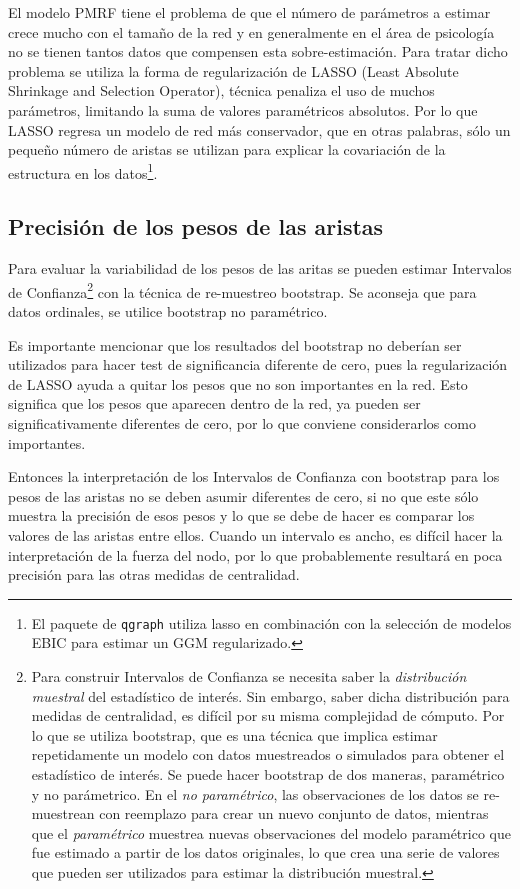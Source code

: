 \documentclass[11pt,spanish]{article}\usepackage[]{graphicx}\usepackage[]{color}
\begin{document}
El modelo PMRF tiene el problema de que el número de parámetros a estimar crece mucho con el tamaño de la red y en generalmente en el área de psicología no se tienen tantos datos que compensen esta sobre-estimación. Para tratar dicho problema se utiliza la forma de regularización de LASSO (Least Absolute Shrinkage and Selection Operator), técnica penaliza el uso de muchos parámetros, limitando la suma de valores paramétricos absolutos. Por lo que LASSO regresa un modelo de red más conservador, que en otras palabras, sólo un pequeño número de aristas se utilizan para explicar la covariación de la estructura en los datos\footnote{El paquete de \texttt{qgraph} utiliza lasso en combinación con la selección de modelos EBIC para estimar un GGM regularizado.}. 


\subsection{Precisión de los pesos de las aristas}

Para evaluar la variabilidad de los pesos de las aritas se pueden estimar Intervalos de Confianza\footnote{Para construir Intervalos de Confianza se necesita saber la \emph{distribución muestral} del estadístico de interés. Sin embargo, saber dicha distribución para medidas de centralidad, es difícil por su misma complejidad de cómputo. Por lo que se utiliza bootstrap, que es una técnica que implica estimar repetidamente un modelo con datos muestreados o simulados para obtener el estadístico de interés. Se puede hacer bootstrap de dos maneras, paramétrico y no parámetrico. En el \emph{no paramétrico}, las observaciones de los datos se re-muestrean con reemplazo para crear un nuevo conjunto de datos, mientras que el \emph{paramétrico} muestrea nuevas observaciones del modelo paramétrico que fue estimado a partir de los datos originales, lo que crea una serie de valores que pueden ser utilizados para estimar la distribución muestral.} con la técnica de re-muestreo bootstrap. Se aconseja que para datos ordinales, se utilice bootstrap no paramétrico. 

Es importante mencionar que los resultados del bootstrap no deberían ser utilizados para hacer test de significancia diferente de cero, pues la regularización de LASSO ayuda a quitar los pesos que no son importantes en la red. Esto significa que los pesos que aparecen dentro de la red, ya pueden ser significativamente diferentes de cero, por lo que conviene considerarlos como importantes. 

Entonces la interpretación de los Intervalos de Confianza con bootstrap para los pesos de las aristas no se deben asumir diferentes de cero, si no que este sólo muestra la precisión de esos pesos y lo que se debe de hacer es comparar los valores de las aristas entre ellos. Cuando un intervalo es ancho, es difícil hacer la interpretación de la fuerza del nodo, por lo que probablemente resultará en poca precisión para las otras medidas de centralidad. 
\end{document}
